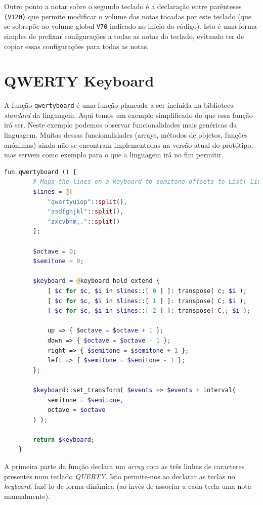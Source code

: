 \documentclass[
  oneside,
  11pt, a4paper,
  footinclude=true,
  headinclude=true,
  cleardoublepage=empty
]{scrbook}
\begin{document}
    Outro ponto a notar sobre o segundo teclado é a declaração entre parênteses \texttt{(V120)} que permite modificar o volume das notas tocadas por este teclado (que se sobrepõe ao volume global \texttt{V70} indicado no início do código). Isto é uma forma simples de prefixar configurações a todas as notas do teclado, evitando ter de copiar essas configurações para todas as notas.
    
    \section{QWERTY Keyboard}
    A função \texttt{qwertyboard} é uma função planeada a ser incluída na biblioteca \textit{standard} da linguagem. Aqui temos um exemplo simplificado do que essa função irá ser.
    Neste exemplo podemos observar funcionalidades mais genéricas da linguagem. Muitas dessas funcionalidades (arrays, métodos de objetos, funções anónimas) ainda não se encontram implementadas na versão atual do protótipo, mas servem como exemplo para o que a linguagem irá no fim permitir.
    \begin{lstlisting}[caption=Exemplo da sintaxe proposta da linguagem,language=PHP]
    fun qwertyboard () {
        # Maps the lines on a keyboard to semitone offsets to List[ List[ str ] ]
        $lines = @[
            "qwertyuiop"::split(),
            "asdfghjkl"::split(),
            "zxcvbnm,."::split()
        ];
        
        $octave = 0;
        $semitone = 0;
        
        $keyboard = @keyboard hold extend {
            [ $c for $c, $i in $lines::[ 0 ] ]: transpose( c; $i );
            [ $c for $c, $i in $lines::[ 1 ] ]: transpose( C; $i ); 
            [ $c for $c, $i in $lines::[ 2 ] ]: transpose( C,; $i );
            
            up => { $octave = $octave + 1 };
            down => { $octave = $octave - 1 };
            right => { $semitone = $semitone + 1 };
            left => { $semitone = $semitone - 1 };
        };
        
        $keyboard::set_transform( $events => $events + interval( 
            semitone = $semitone, 
            octave = $octave 
        ) );
        
        return $keyboard;
    }
    \end{lstlisting}
    A primeira parte da função declara um \textit{array} com as três linhas de caracteres presentes num teclado \textit{QUERTY}. Isto permite-nos ao declarar as teclas no \textit{keyboard}, fazê-lo de forma dinâmica (ao invés de associar a cada tecla uma nota manualmente).
    
\end{document}
